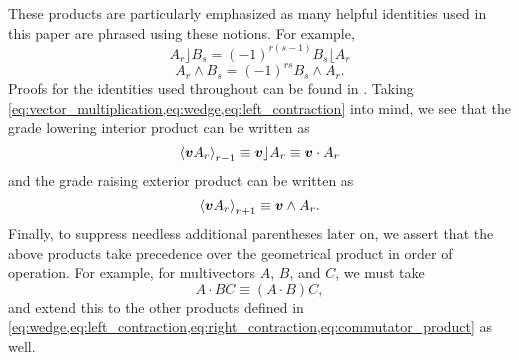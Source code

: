 These products are particularly emphasized as many helpful identities used in this paper are phrased using these notions. For example,
\begin{equation}
\label{eq:contraction_swap}
A_r \rfloor B_s = (-1)^{r(s-1)}B_s \lfloor A_r
\end{equation}
\begin{equation}
\label{eq:wedge_swap}
A_r \wedge B_s = (-1)^{rs}B_s\wedge A_r.
\end{equation}
Proofs for the identities used throughout can be found in \cite{chisolm_geometric_2012}.  Taking \cref{eq:vector_multiplication,eq:wedge,eq:left_contraction} into mind, we see that the grade lowering interior product can be written as
\begin{equation}
    \proj{r-1}{\blade{v}A_r} \equiv \blade{v}\rfloor A_r \equiv \blade{v} \cdot A_r
\end{equation}
and the grade raising exterior product can be written as
\begin{equation}
    \proj{r+1}{\blade{v}A_r} \equiv \blade{v} \wedge A_r.
\end{equation}
Finally, to suppress needless additional parentheses later on, we assert that the above products take precedence over the geometrical product in order of operation. For example, for multivectors $A$, $B$, and $C$, we must take
\begin{equation}
A\cdot B C \equiv (A \cdot B)C,
\end{equation}
and extend this to the other products defined in \cref{eq:wedge,eq:left_contraction,eq:right_contraction,eq:commutator_product} as well.

